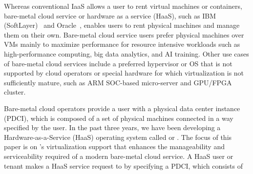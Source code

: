 Whereas conventional IaaS allows a user to rent virtual machines or containers, 
bare-metal cloud service or hardware as a service (HaaS), 
such as  IBM (SoftLayer)~\cite{softlayer} and Oracle~\cite{oracle}, enables users to 
rent physical machines and manage them on their own. 
Bare-metal cloud service users prefer physical machines over VMs mainly
to maximize performance for resource intensive workloads 
such as high-performance computing, big data analytics, and AI training.
Other use cases of bare-metal cloud services include a preferred hypervisor 
or OS that is not supported by cloud operators or special hardware for which virtualization 
is not sufficiently mature, such as ARM SOC-based micro-server and GPU/FPGA cluster.

Bare-metal cloud operators provide a user with a physical data center instance (PDCI), which is 
composed of a set of physical machines connected in a way specified by the user. 
In the past three years, we have been developing a Hardware-as-a-Service (HaaS) operating system called \fullname or \sna.  
The focus of this paper is on \sna's virtualization support that enhances the manageability and serviceability required of a modern bare-metal cloud service. 
A HaaS user or tenant makes a HaaS service request to \na by specifying a PDCI, which consists of 

